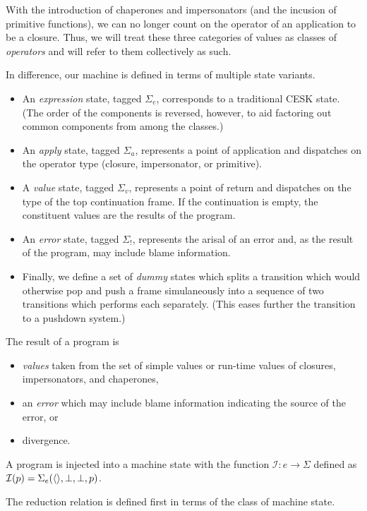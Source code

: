 \documentclass{sigplanconf}
\begin{document}
With the introduction of chaperones and impersonators (and the incusion of primitive functions), we can no longer count on the operator of an application to be a closure.
Thus, we will treat these three categories of values as classes of \emph{operators} and will refer to them collectively as such.

In difference, our machine is defined in terms of multiple state variants.
\begin{itemize}
\item An \emph{expression} state, tagged $\Sigma_{e}$, corresponds to a traditional CESK state.
(The order of the components is reversed, however, to aid factoring out common components from among the classes.)
\item An \emph{apply} state, tagged $\Sigma_{a}$, represents a point of application and dispatches on the operator type (closure, impersonator, or primitive).
\item A \emph{value} state, tagged $\Sigma_{v}$, represents a point of return and dispatches on the type of the top continuation frame.
If the continuation is empty, the constituent values are the results of the program.
\item An \emph{error} state, tagged $\Sigma_!$, represents the arisal of an error and, as the result of the program, may include blame information.
\item Finally, we define a set of \emph{dummy} states which splits a transition which would otherwise pop and push a frame simulaneously into a sequence of two transitions which performs each separately.
(This eases further the transition to a pushdown system.)
\end{itemize}

The result of a program is
\begin{itemize}
\item \emph{values} taken from the set of simple values or run-time values of closures, impersonators, and chaperones,
\item an \emph{error} which may include blame information indicating the source of the error, or
\item divergence.
\end{itemize}

A program is injected into a machine state with the function $\mathcal{I} : e\rightarrow\Sigma$ defined as $\mathcal{I}(p)=\Sigma_e(\langle\rangle,\perp,\perp,p)$.

The reduction relation is defined first in terms of the class of machine state.
\end{document}

